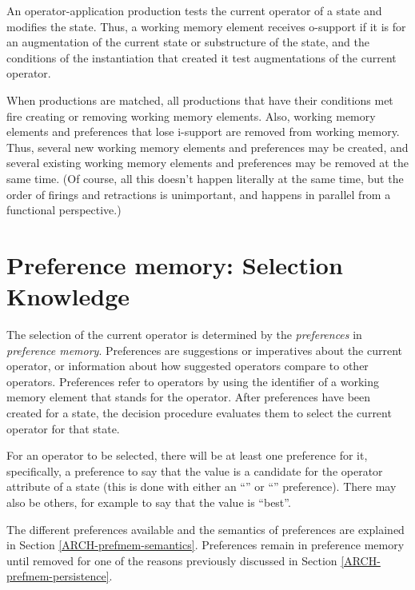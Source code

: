 An operator-application production tests the current operator of a state
and modifies the state. Thus, a working memory element receives
o-support if it is for an augmentation of the current state or
substructure of the state, and the conditions of the instantiation that
created it test augmentations of the current operator.  

When productions are matched, all productions that have their conditions
met fire creating or removing working memory elements.  Also, working
memory elements and preferences that lose i-support are removed from
working memory. Thus, several new working memory elements and
preferences may be created, and several existing working memory elements
and preferences may be removed at the same time.  (Of
course, all this doesn't happen literally at the same time, but the
order of firings and retractions is unimportant, and happens in parallel
from a functional perspective.)

\section{Preference memory: Selection Knowledge} 
\label{ARCH-prefmem}


The selection of the current operator is determined by the \emph{preferences} in
\emph{preference memory}. Preferences are suggestions or imperatives about the
current operator, or information about how suggested operators compare
to other operators.  Preferences refer to operators by using the
identifier of a working memory element that stands for the operator.
After preferences have been created for a state, the decision procedure
evaluates them to select the current operator for that state.

For an operator to be selected, there will be at least one preference
for it, specifically, a preference to say that the value is a candidate
for the operator attribute of a state (this is done with either an
``'' or ``'' preference). There may also
be others, for example to say that the value is ``best''.

The different preferences available and the semantics of preferences are
explained in Section \ref{ARCH-prefmem-semantics}. Preferences remain in
preference memory until removed for one of the reasons previously discussed in
Section \ref{ARCH-prefmem-persistence}.

